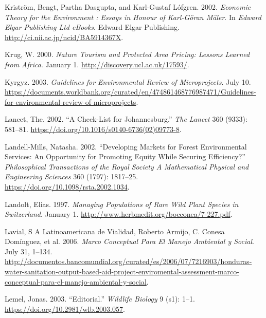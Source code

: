 \begin{CSLReferences}{1}{1}
Kriström, Bengt, Partha Dasgupta, and Karl‐Gustaf Lófgren. 2002.
\emph{Economic Theory for the Environment : Essays in Honour of
Karl-Göran Mäler}. In \emph{Edward Elgar Publishing Ltd eBooks}. Edward
Elgar Publishing. \url{http://ci.nii.ac.jp/ncid/BA5914367X}.

Krug, W. 2000. \emph{Nature Tourism and Protected Area Pricing: Lessons
Learned from Africa}. January 1.
\url{http://discovery.ucl.ac.uk/17593/}.

Kyrgyz. 2003. \emph{Guidelines for Environmental Review of
Microprojects}. July 10.
\url{https://documents.worldbank.org/curated/en/474861468776987471/Guidelines-for-environmental-review-of-microprojects}.

Lancet, The. 2002. {``A Check-List for Johannesburg.''} \emph{The
Lancet} 360 (9333): 581--81.
\url{https://doi.org/10.1016/s0140-6736(02)09773-8}.

Landell-Mills, Natasha. 2002. {``Developing Markets for Forest
Environmental Services: An Opportunity for Promoting Equity While
Securing Efficiency?''} \emph{Philosophical Transactions of the Royal
Society A Mathematical Physical and Engineering Sciences} 360 (1797):
1817--25. \url{https://doi.org/10.1098/rsta.2002.1034}.

Landolt, Elias. 1997. \emph{Managing Populations of Rare Wild Plant
Species in Switzerland}. January 1.
\url{http://www.herbmedit.org/bocconea/7-227.pdf}.

Lavial, S A Latinoamericana de Vialidad, Roberto Armijo, C. Conesa
Domínguez, et al. 2006. \emph{Marco Conceptual Para El Manejo Ambiental
y Social}. July 31, 1--134.
\url{http://documentos.bancomundial.org/curated/es/2006/07/7216903/honduras-water-sanitation-output-based-aid-project-enviromental-assessment-marco-conceptual-para-el-manejo-ambiental-y-social}.

Lemel, Jonas. 2003. {``Editorial.''} \emph{Wildlife Biology} 9 (s1):
1--1. \url{https://doi.org/10.2981/wlb.2003.057}.


\end{CSLReferences}
